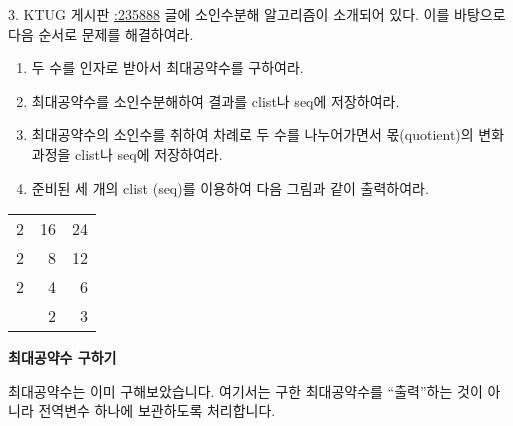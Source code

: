 \documentclass[a4paper,amsmath]{oblivoir}
\makeatletter
\let\ATonum\@onum
\makeatother
\begin{document}
\begin{questionp}
 3. KTUG 게시판 \href{http://www.ktug.org/xe/index.php?document_srl=235888&mid=KTUG_open_board}{:235888} 글에 소인수분해 알고리즘이 소개되어 있다. 
이를 바탕으로 다음 순서로 문제를 해결하여라.
\begin{enumerate}[\ \ \expandafter\ATonum1] \firmlist
\item 두 수를 인자로 받아서 최대공약수를 구하여라.
\item 최대공약수를 소인수분해하여 결과를 clist나 seq에 저장하여라.
\item 최대공약수의 소인수를 취하여 차례로 두 수를 나누어가면서 몫(quotient)의 변화 과정을 clist나 seq에 저장하여라.
\item 준비된 세 개의 clist (seq)를 이용하여 다음 그림과 같이 출력하여라.
\end{enumerate}
\begin{center}
\begin{tabular}{r|rr}
2 & 16 & 24 \\ \cline{2-3}
2 & 8  & 12 \\ \cline{2-3}
2 & 4 & 6 \\ \cline{2-3}
  & 2 & 3 \\ 
\end{tabular}
\end{center}
\end{questionp}

\textbf{\ATonum 1 최대공약수 구하기}

최대공약수는 이미 구해보았습니다. 여기서는 구한 최대공약수를 “출력”하는 것이 아니라 
전역변수 하나에 보관하도록 처리합니다. 

\end{document}
